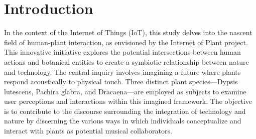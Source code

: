 \section{Introduction}



In the context of the Internet of Things (IoT), this study delves into the nascent field of human-plant interaction, as envisioned by the Internet of Plant project. This innovative initiative explores the potential intersections between human actions and botanical entities to create a symbiotic relationship between nature and technology. The central inquiry involves imagining a future where plants respond acoustically to physical touch. Three distinct plant species—Dypsis lutescens, Pachira glabra, and Dracaena—are employed as subjects to examine user perceptions and interactions within this imagined framework. The objective is to contribute to the discourse surrounding the integration of technology and nature by discerning the various ways in which individuals conceptualize and interact with plants as potential musical collaborators.






